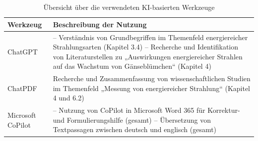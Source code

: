 

\section*{\sectionname}
\printbibliography[heading=none] %

\begin{table}[hp]
    \centering
    \let\oldaddcontentsline\addcontentsline %
    \renewcommand{\addcontentsline}[3]{}
    \caption{Übersicht über die verwendeten KI-basierten Werkzeuge}\label{tab:ki-werkzeuge}
    \let\addcontentsline\oldaddcontentsline
    \begin{tabularx}{\textwidth}{|l|X|}
        \hline
        Werkzeug & Beschreibung der Nutzung \\
        \hline
        ChatGPT &
        – Verständnis von Grundbegriffen im Themenfeld energiereicher Strahlungsarten (Kapitel 3.4)\newline
        – Recherche und Identifikation von Literaturstellen zu „Auswirkungen energiereicher Strahlen auf das Wachstum von Gänseblümchen“ (Kapitel 4) \\
        \hline
        ChatPDF &
        Recherche und Zusammenfassung von wissenschaftlichen Studien im Themenfeld „Messung von energiereicher Strahlung“ (Kapitel 4 und 6.2) \\
        \hline
        Microsoft CoPilot &
        – Nutzung von CoPilot in Microsoft Word 365 für Korrektur- und Formulierungshilfe (gesamt)\newline
        – Übersetzung von Textpassagen zwischen deutsch und englisch (gesamt) \\
        \hline
    \end{tabularx}
\end{table}